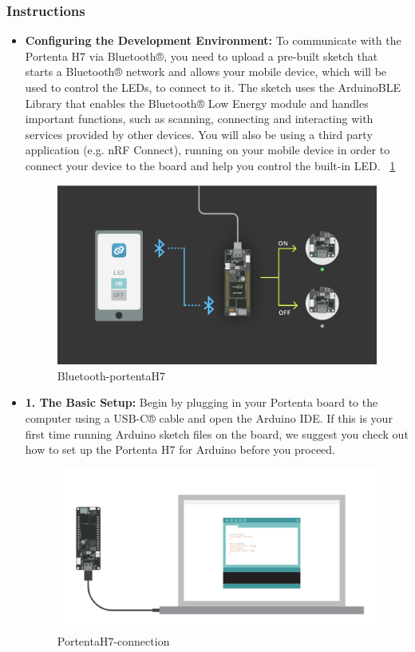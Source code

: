		\subsubsection{Instructions}
			\begin{itemize}
				\item \textbf{Configuring the Development Environment:} To communicate with the Portenta H7 via Bluetooth®, you need to upload a pre-built sketch that starts a Bluetooth® network and allows your mobile device, which will be used to control the LEDs, to connect to it. The sketch uses the ArduinoBLE Library that enables the Bluetooth® Low Energy module and handles important functions, such as scanning, connecting and interacting with services provided by other devices. You will also be using a third party application (e.g. nRF Connect), running on your mobile device in order to connect your device to the board and help you control the built-in LED. ~\ref{Bluetooth-portentaH7}
					\begin{figure}
						\begin{center}
							\includegraphics[width=0.7\linewidth]{Images/PortentaH7/Bluetooth-portentaH7.png}
							\caption{Bluetooth-portentaH7}
							\label{Bluetooth-portentaH7}
						\end{center}
					\end{figure}
					
				\item \textbf{1. The Basic Setup:} Begin by plugging in your Portenta board to the computer using a USB-C® cable and open the Arduino IDE. If this is your first time running Arduino sketch files on the board, we suggest you check out how to set up the Portenta H7 for Arduino before you proceed.
					\begin{figure}
						\begin{center}
							\includegraphics[width=0.7\linewidth]{Images/PortentaH7/PortentaH7-connection.png}
							\caption{PortentaH7-connection}
							\label{PortentaH7-connection}
						\end{center}
					\end{figure}
				

\end{itemize}
